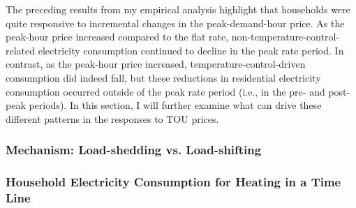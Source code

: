 The preceding results from my empirical analysis highlight that households were quite responsive to incremental changes in the peak-demand-hour price. As the peak-hour price increased compared to the flat rate, non-temperature-control-related electricity consumption continued to decline in the peak rate period. In contrast, as the peak-hour price increased, temperature-control-driven consumption did indeed fall, but these reductions in residential electricity consumption occurred outside of the peak rate period (i.e., in the pre- and post-peak periods). In this section, I will further examine what can drive these different patterns in the responses to TOU prices. 

\subsubsection{Mechanism: Load-shedding vs. Load-shifting}
\label{Sub-subsection:Mechanism}



\subsubsection{Household Electricity Consumption for Heating in a Time Line}
\label{Sub-subsection:Household-Electricity-Consumption-for-Heating-in-a-Time-Line}
